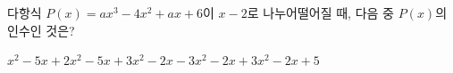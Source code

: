 다항식 $P(x)=ax^3-4x^2+ax+6$이 $x-2$로 나누어떨어질 때, 다음 중 $P(x)$의 인수인 것은? 
\begin{choicesii}{$x^2-5x+2$}{$x^2-5x+3$}{$x^2-2x-3$}{$x^2-2x+3$}{$x^2-2x+5$}\end{choicesii}
